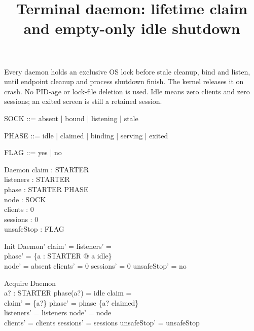 \documentclass[a4paper,10pt]{article}
\begin{document}
\title{Terminal daemon: lifetime claim and empty-only idle shutdown}
\maketitle

Every daemon holds an exclusive OS lock before stale cleanup, bind and listen,
until endpoint cleanup and process shutdown finish. The kernel releases it
on crash. No PID-age or lock-file deletion is used. Idle means zero clients
and zero sessions; an exited screen is still a retained session.

\begin{zed}
[STARTER]
\end{zed}
\begin{zed}
SOCK ::= absent | bound | listening | stale
\end{zed}
\begin{zed}
PHASE ::= idle | claimed | binding | serving | exited
\end{zed}
\begin{zed}
FLAG ::= yes | no
\end{zed}
\begin{schema}{Daemon}
claim : \power STARTER \\
listeners : \power STARTER \\
phase : STARTER \fun PHASE \\
node : SOCK \\
clients : 0  \\
sessions : 0  \\
unsafeStop : FLAG
\end{schema}
\begin{schema}{Init}
Daemon'
\where
claim' = \emptyset \land listeners' = \emptyset \\
phase' = \{a : STARTER @ a \mapsto idle\} \\
node' = absent \land clients' = 0 \land sessions' = 0 \land unsafeStop' = no
\end{schema}
\begin{schema}{Acquire}
\Delta Daemon \\
a? : STARTER
\where
phase(a?) = idle \land claim = \emptyset \\
claim' = \{a?\} \land phase' = phase \oplus \{a? \mapsto claimed\} \\
listeners' = listeners \land node' = node \\
clients' = clients \land sessions' = sessions \land unsafeStop' = unsafeStop
\end{schema}
\end{document}
